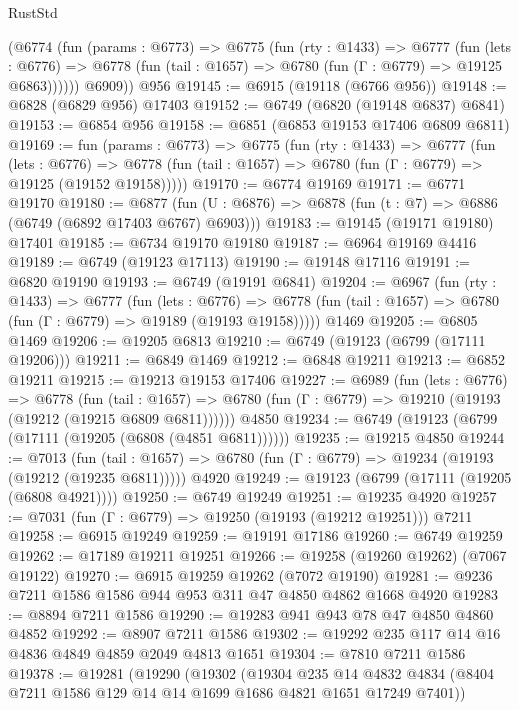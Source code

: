 \begin{lexlean}{RustStd}
\begin{coremodule}
        (@6774
          (fun (params : @6773) =>
          @6775
            (fun (rty : @1433) =>
            @6777
              (fun (lets : @6776) =>
              @6778 (fun (tail : @1657) => @6780 (fun (Γ : @6779) => @19125 @6863))))))
        @6909))
    @956
@19145 := @6915 (@19118 (@6766 @956))
@19148 := @6828 (@6829 @956) @17403
@19152 := @6749 (@6820 (@19148 @6837) @6841)
@19153 := @6854 @956
@19158 := @6851 (@6853 @19153 @17406 @6809 @6811)
@19169 := fun (params : @6773) =>
  @6775
    (fun (rty : @1433) =>
    @6777
      (fun (lets : @6776) =>
      @6778 (fun (tail : @1657) => @6780 (fun (Γ : @6779) => @19125 (@19152 @19158)))))
@19170 := @6774 @19169
@19171 := @6771 @19170
@19180 := @6877
    (fun (U : @6876) => @6878 (fun (t : @7) => @6886 (@6749 (@6892 @17403 @6767) @6903)))
@19183 := @19145 (@19171 @19180) @17401
@19185 := @6734 @19170 @19180
@19187 := @6964 @19169 @4416
@19189 := @6749 (@19123 @17113)
@19190 := @19148 @17116
@19191 := @6820 @19190
@19193 := @6749 (@19191 @6841)
@19204 := @6967
    (fun (rty : @1433) =>
    @6777
      (fun (lets : @6776) =>
      @6778 (fun (tail : @1657) => @6780 (fun (Γ : @6779) => @19189 (@19193 @19158)))))
    @1469
@19205 := @6805 @1469
@19206 := @19205 @6813
@19210 := @6749 (@19123 (@6799 (@17111 @19206)))
@19211 := @6849 @1469
@19212 := @6848 @19211
@19213 := @6852 @19211
@19215 := @19213 @19153 @17406
@19227 := @6989
    (fun (lets : @6776) =>
    @6778
      (fun (tail : @1657) =>
      @6780 (fun (Γ : @6779) => @19210 (@19193 (@19212 (@19215 @6809 @6811))))))
    @4850
@19234 := @6749 (@19123 (@6799 (@17111 (@19205 (@6808 (@4851 @6811))))))
@19235 := @19215 @4850
@19244 := @7013
    (fun (tail : @1657) => @6780 (fun (Γ : @6779) => @19234 (@19193 (@19212 (@19235 @6811)))))
    @4920
@19249 := @19123 (@6799 (@17111 (@19205 (@6808 @4921))))
@19250 := @6749 @19249
@19251 := @19235 @4920
@19257 := @7031 (fun (Γ : @6779) => @19250 (@19193 (@19212 @19251))) @7211
@19258 := @6915 @19249
@19259 := @19191 @17186
@19260 := @6749 @19259
@19262 := @17189 @19211 @19251
@19266 := @19258 (@19260 @19262) (@7067 @19122)
@19270 := @6915 @19259 @19262 (@7072 @19190)
@19281 := @9236 @7211 @1586 @1586 @944 @953 @311 @47 @4850 @4862 @1668 @4920
@19283 := @8894 @7211 @1586
@19290 := @19283 @941 @943 @78 @47 @4850 @4860 @4852
@19292 := @8907 @7211 @1586
@19302 := @19292 @235 @117 @14 @16 @4836 @4849 @4859 @2049 @4813 @1651
@19304 := @7810 @7211 @1586
@19378 := @19281
    (@19290
      (@19302
        (@19304
          @235
          @14
          @4832
          @4834
          (@8404 @7211 @1586 @129 @14 @14 @1699 @1686 @4821 @1651 @17249 @7401))

\end{coremodule}
\end{lexlean}
